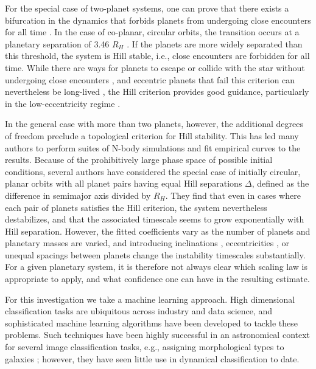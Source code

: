 For the special case of two-planet systems, one can prove that there exists a bifurcation in the dynamics that forbids planets from undergoing close encounters for all time \citep{Marchal82, Milani83}.
In the case of co-planar, circular orbits, the transition occurs at a planetary separation of 3.46 $R_H$ \citep{Gladman1993}.
If the planets are more widely separated than this threshold, the system is Hill stable, i.e., close encounters are forbidden for all time.
While there are ways for planets to escape or collide with the star without undergoing close encounters \citep[e.g.,][]{Deck12, Veras13hill}, and eccentric planets that fail this criterion can nevertheless be long-lived \citep[e.g.,][]{Gladman1993}, the Hill criterion provides good guidance, particularly in the low-eccentricity regime \citep{Barnes06}.

In the general case with more than two planets, however, the additional degrees of freedom preclude a topological criterion for Hill stability.
This has led many authors to perform suites of N-body simulations and fit empirical curves to the results.
Because of the prohibitively large phase space of possible initial conditions, several authors \citep[][Obertas et al., submitted]{Chambers1996, Faber07, Smith09} have considered the special case of initially circular, planar orbits with all planet pairs having equal Hill separations $\Delta$, defined as the difference in semimajor axis divided by $R_H$.
They find that even in cases where each pair of planets satisfies the Hill criterion, the system nevertheless destabilizes, and that the associated timescale seems to grow exponentially with Hill separation.
However, the fitted coefficients vary as the number of planets and planetary masses are varied, and introducing inclinations \citep{Marzari02}, eccentricities \citep{Ito99, Chatterjee08, Pu2015}, or unequal spacings between planets \citep{Marzari14} change the instability timescales substantially.
For a given planetary system, it is therefore not always clear which scaling law is appropriate to apply, and what confidence one can have in the resulting estimate.

For this investigation we take a machine learning approach.
High dimensional classification tasks are ubiquitous across industry and data science, and sophisticated machine learning algorithms have been developed to tackle these problems.
Such techniques have been highly successful in an astronomical context for several image classification tasks, e.g., assigning morphological types to galaxies \citep{Collister04}; however, they have seen little use in dynamical classification to date\citep[see][for a recent counterexample]{Petrovich15}.
 
